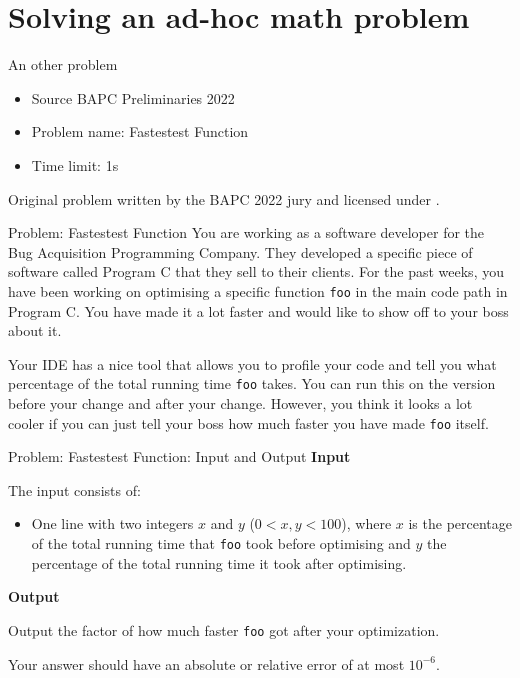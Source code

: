 \documentclass[11pt,pdf, aspectratio=169]{beamer}
\begin{document}
  \section{Solving an ad-hoc math problem}
  \begin{frame}{An other problem}
    \begin{itemize}
      \item Source BAPC Preliminaries 2022
      \item Problem name: Fastestest Function
      \item Time limit: 1s
    \end{itemize}
    Original problem written by the BAPC 2022 jury and licensed under \doclicenseLongNameRef.

    \doclicenseImage

  \end{frame}
  \begin{frame}{Problem: Fastestest Function}
    You are working as a software developer for the Bug Acquisition Programming Company.
    They developed a specific piece of software called Program C that they sell to their clients.
    For the past weeks, you have been working on optimising a specific function \texttt{foo} in the main code path in Program C.
    You have made it a lot faster and would like to show off to your boss about it.

    Your IDE has a nice tool that allows you to profile your code and tell you what percentage of the total running time \texttt{foo} takes.
    You can run this on the version before your change and after your change.
    However, you think it looks a lot cooler if you can just tell your boss how much faster you have made        \texttt{foo} itself.
  \end{frame}
  \begin{frame}{Problem: Fastestest Function: Input and Output}
    \textbf{Input}

    The input consists of:
    \begin{itemize}
      \item One line with two integers $x$ and $y$ ($0 < x, y < 100$),
      where $x$ is the percentage of the total running time that \texttt{foo} took before optimising
      and $y$ the percentage of the total running time it took after optimising.
    \end{itemize}

    \textbf{Output}

    Output the factor of how much faster \texttt{foo} got after your optimization.

    Your answer should have an absolute or relative error of at most $10^{-6}$.
  \end{frame}
\end{document}
